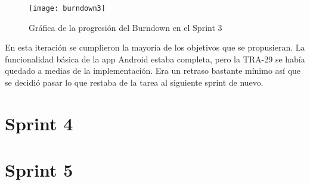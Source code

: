 \begin{table}[H]
\label{TRA-30}
\end{table}

\begin{figure}[h]
    \centering
    \texttt{[image: burndown3]}
    \caption[Burndown Sprint 3]{Gráfica de la progresión del Burndown en el Sprint 3}
\end{figure}

En esta iteración se cumplieron la mayoría de los objetivos que se propusieran. La funcionalidad básica de la app Android estaba completa, pero la TRA-29 se había quedado a medias de la implementación. Era un retraso bastante mínimo así que se decidió pasar lo que restaba de la tarea al siguiente sprint de nuevo.

\section{Sprint 4}

\section{Sprint 5}
